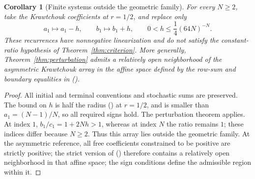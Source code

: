 \documentclass[twoside,10pt]{article}
\numberwithin{equation}{section}
\theoremstyle{slbody}
\newtheorem{corollary}[theorem]{Corollary}
\theoremstyle{definition}
\theoremstyle{remark}
\renewcommand{\eqref}[1]{\textup{{\normalfont(\oldstylenums{\ref{#1}}}\normalfont)}}
\begin{document}
\begin{corollary}[Finite systems outside the geometric family]\label{cor:nonclassical}
For every $N\geq2$, take the Krawtchouk coefficients at $r=1/2$, and replace only
\[
a_1\longmapsto a_1-h,\qquad b_1\longmapsto b_1+h,
\qquad 0<h\leq\frac14(64N)^{-N}.
\]
These recurrences have nonnegative linearization and do not satisfy the constant-ratio hypothesis of Theorem~\ref{thm:criterion}. More generally, Theorem~\ref{thm:perturbation} admits a relatively open neighborhood of the asymmetric Krawtchouk array in the affine space defined by the row-sum and boundary equalities in \eqref{eq:basic}.
\end{corollary}
\begin{proof}
All initial and terminal conventions and stochastic sums are preserved. The bound on $h$ is half the radius \eqref{eq:radius} at $r=1/2$, and is smaller than $a_1=(N-1)/N$, so all required signs hold. The perturbation theorem applies. At index $1$, $b_1/c_1=1+2Nh>1$, whereas at index $N$ the ratio remains $1$; these indices differ because $N\geq2$. Thus this array lies outside the geometric family. At the asymmetric reference, all free coefficients constrained to be positive are strictly positive; the strict version of \eqref{eq:closeness} therefore contains a relatively open neighborhood in that affine space; the sign conditions define the admissible region within it.
\end{proof}
\end{document}
